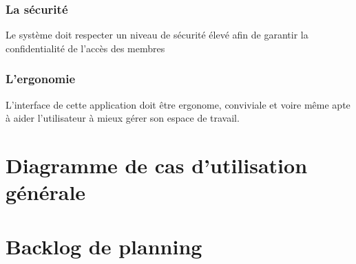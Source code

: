 \subsubsection{La s\'{e}curit\'{e}}

Le syst\`{e}me doit respecter un niveau de s\'{e}curit\'{e} \'{e}lev\'{e} afin de garantir la
confidentialit\'{e} de l'acc\`{e}s des membres

\subsubsection{L'ergonomie }

L'interface de cette application doit \^{e}tre ergonome, conviviale et voire m\^{e}me
apte \`{a} aider l'utilisateur \`{a} mieux g\'{e}rer son espace de travail.



\section{ Diagramme de cas d'utilisation g\'{e}n\'{e}rale }



\section{Backlog de planning}


%


